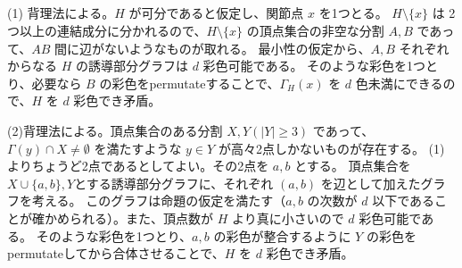 \subsection{}
(1) 背理法による。$H$ が可分であると仮定し、関節点 $x$ を1つとる。
$H \setminus \{x\}$ は 2つ以上の連結成分に分かれるので、$H \setminus \{x\}$ の頂点集合の非空な分割 $A,B$ であって、$AB$ 間に辺がないようなものが取れる。
最小性の仮定から、$A,B$ それぞれからなる $H$ の誘導部分グラフは $d$ 彩色可能である。
そのような彩色を1つとり、必要なら $B$ の彩色をpermutateすることで、$\Gamma_H(x)$ を $d$ 色未満にできるので、$H$ を $d$ 彩色でき矛盾。

(2)背理法による。頂点集合のある分割 $X,Y (|Y| \geq 3)$ であって、$\Gamma(y)\cap X \neq \emptyset$ を満たすような $y\in Y$ が高々2点しかないものが存在する。
(1)よりちょうど2点であるとしてよい。その2点を $a,b$ とする。
頂点集合を$X\cup \{a,b\}, Y$とする誘導部分グラフに、それぞれ $(a,b)$ を辺として加えたグラフを考える。
このグラフは命題の仮定を満たす（$a,b$ の次数が $d$ 以下であることが確かめられる）。また、頂点数が $H$ より真に小さいので $d$ 彩色可能である。
そのような彩色を1つとり、$a,b$ の彩色が整合するように $Y$ の彩色をpermutateしてから合体させることで、$H$ を $d$ 彩色でき矛盾。
